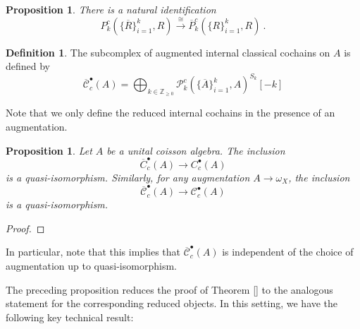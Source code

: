 \documentclass[11pt]{amsart}
\numberwithin{equation}{section}
\newtheorem{prop}[theo]{Proposition}
\theoremstyle{definition}
\newtheorem{defn}[theo]{Definition}
\newcommand{\bb}{\mathbb}
\newcommand{\mc}{\mathcal}
\newcommand{\0}{{\textbf{0}}}
\newcommand{\Z}{\bb Z}
\begin{document}
\begin{prop}  There is a natural identification
	\[ P_{k}^c( \{\overline{R}\}_{i=1}^{k} , R) \xrightarrow{\cong} \overline{P}_{k}^c( \{R\}_{i=1}^{k} , R)    \ . \]
\end{prop}




\begin{defn} The subcomplex of augmented internal classical cochains on $A$ is defined by
	\[ \overline{\mc C}^\bullet_c(A) =   \bigoplus_{k \in \Z_{\geq 0}} \mc P_{k}^c( \{\overline{A}\}_{i=1}^{k} , A)^{S_k}[-k] \]
\end{defn}
Note that we only define the reduced internal cochains in the presence of an augmentation.


\begin{prop} Let $A$ be a unital coisson algebra. The inclusion
	\[ \overline{C}^\bullet_c(A) \to C^\bullet_c(A) \]
	is a quasi-isomorphism. Similarly, for any augmentation $A\to \omega_X$, the inclusion
	\[  \overline{\mc C}^\bullet_c(A) \to  \mc C^\bullet_c(A)  \]
	is a quasi-isomorphism.
\end{prop}
\begin{proof}
	
\end{proof}

In particular, note that this implies that $\overline{\mc C}^\bullet_c(A)$ is independent of the choice of augmentation up to quasi-isomorphism.


The preceding proposition reduces the proof of Theorem \ref{} to the analogous statement for the corresponding reduced objects. In this setting, we have the following key technical result:
\end{document}
